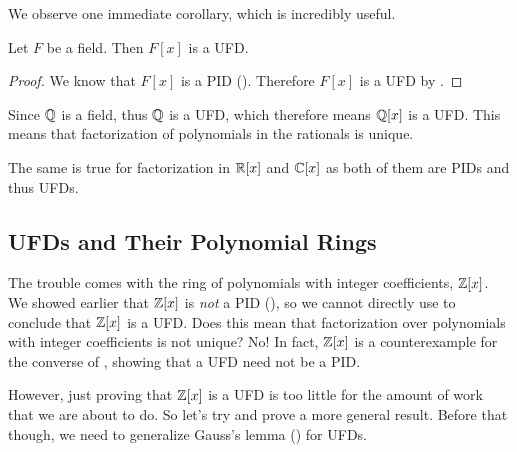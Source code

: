 We observe one immediate corollary, which is incredibly useful.

\begin{corollary}\label{corollary-polynomial-ring-over-field-is-UFD}
    Let $F$ be a field. Then $F[x]$ is a UFD.
\end{corollary}
\begin{proof}
    We know that $F[x]$ is a PID (). Therefore $F[x]$ is a UFD by .
\end{proof}

\begin{example}
    Since $\mathbb{Q}$ is a field, thus $\mathbb{Q}$ is a UFD, which therefore means $\mathbb{Q}[x]$ is a UFD. This means that factorization of polynomials in the rationals is unique.
\end{example}

\begin{example}
    The same is true for factorization in $\mathbb{R}[x]$ and $\mathbb{C}[x]$ as both of them are PIDs and thus UFDs.
\end{example}

\subsection{UFDs and Their Polynomial Rings}
The trouble comes with the ring of polynomials with integer coefficients, $\mathbb{Z}[x]$. We showed earlier that $\mathbb{Z}[x]$ is \textit{not} a PID (), so we cannot directly use  to conclude that $\mathbb{Z}[x]$ is a UFD. Does this mean that factorization over polynomials with integer coefficients is not unique? No! In fact, $\mathbb{Z}[x]$ is a counterexample for the converse of , showing that a UFD need not be a PID.

However, just proving that $\mathbb{Z}[x]$ is a UFD is too little for the amount of work that we are about to do. So let's try and prove a more general result. Before that though, we need to generalize Gauss's lemma () for UFDs.

